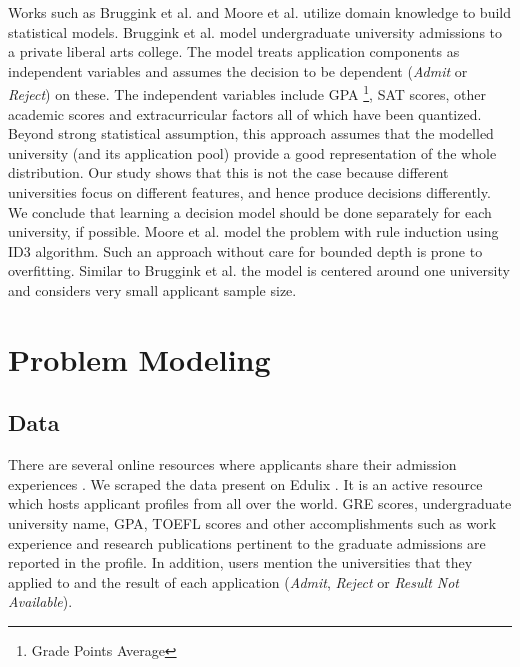 \documentclass{sig-alternate-05-2015}
\begin{document}
Works such as Bruggink et al. and Moore et al. utilize domain knowledge to build statistical models\cite{bruggink, moore}. Bruggink et al. model undergraduate university admissions to a private liberal arts college. The model treats application components as independent variables and assumes the decision to be dependent (\textit{Admit} or \textit{Reject}) on these. The independent variables include GPA \footnote{Grade Points Average}, SAT scores, other academic scores and extracurricular factors all of which have been quantized. Beyond strong statistical assumption, this approach assumes that the modelled university (and its application pool) provide a good representation of the whole distribution. Our study shows that this is not the case because different universities focus on different features, and hence produce decisions differently. We conclude that learning a decision model should be done separately for each university, if possible. Moore et al. model the problem with rule induction using ID3 algorithm. Such an approach without care for bounded depth is prone to overfitting. Similar to Bruggink et al. the model is centered around one university and considers very small applicant sample size.


\section{Problem Modeling}
\label{sec:problem-modeling}

\subsection{Data}
\label{subsec:dataset}
There are several online resources where applicants share their admission experiences \cite{edulix, gradcafe}. We scraped the data present on Edulix \cite{edulix}. It is an active resource which hosts applicant profiles from all over the world. GRE scores, undergraduate university name, GPA, TOEFL scores and other accomplishments such as work experience and research publications pertinent to the graduate admissions are reported in the profile. In addition, users mention the universities that they applied to and the result of each application (\textit{Admit}, \textit{Reject} or \textit{Result Not Available}).
\end{document}
